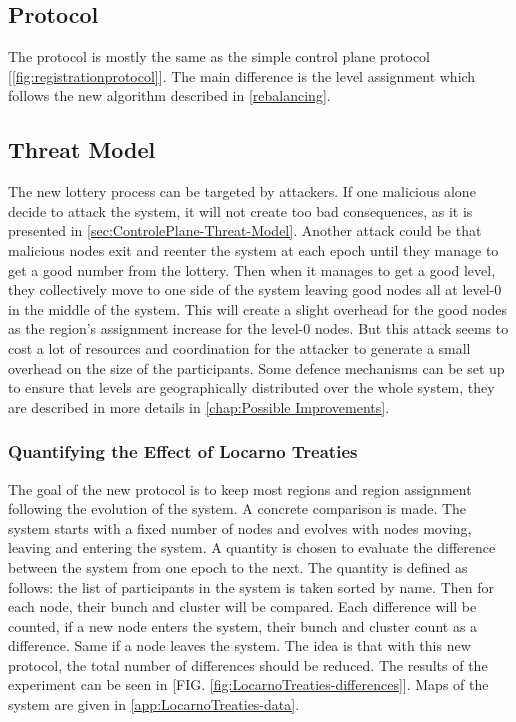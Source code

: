 \documentclass[a4paper,11pt,oneside]{report}
\begin{document}
\subsection{Protocol}
The protocol is mostly the same as the simple control plane protocol [\autoref{fig:registrationprotocol}]. The main difference is the level assignment
which follows the new algorithm described in \autoref{rebalancing}. 

\subsection{Threat Model}

The new lottery process can be targeted by attackers. If one malicious alone decide to attack the system, it will not create too
bad consequences, as it is presented in \autoref{sec:ControlePlane-Threat-Model}. Another attack could be that malicious nodes exit and reenter the system at
each epoch until they manage to get a good number from the lottery. Then when
it manages to get a good level, they collectively move to one side of the system
leaving good nodes all at level-0 in the middle of the system. This will create
a slight overhead for the good nodes as the region’s assignment increase for
the level-0 nodes. But this attack seems to cost a lot of resources and
coordination for the attacker to generate a small overhead on the size of the
participants. Some defence mechanisms can be set up to ensure that levels are geographically
distributed over the whole system, they are described in more details in
\autoref{chap:Possible Improvements}.

\subsubsection{Quantifying the Effect of Locarno Treaties}
The goal of the new protocol is to keep most regions and region assignment
following the evolution of the system. A concrete comparison is made. The system starts with a fixed number of nodes
and evolves with nodes moving, leaving and entering the system. A quantity is
chosen to evaluate the difference between the system from one epoch to the
next. The quantity is defined as follows: the list of participants in the
system is taken sorted by name. Then for each node, their bunch and cluster
will be compared. Each difference will be counted, if a new node enters the
system, their bunch and cluster count as a difference. Same if a node leaves
the system. The idea is that with this new protocol, the total number of differences should be
reduced. The results of the experiment can be seen in [FIG. \autoref{fig:LocarnoTreaties-differences}]. Maps of
the system are given in \autoref{app:LocarnoTreaties-data}.
\end{document}
